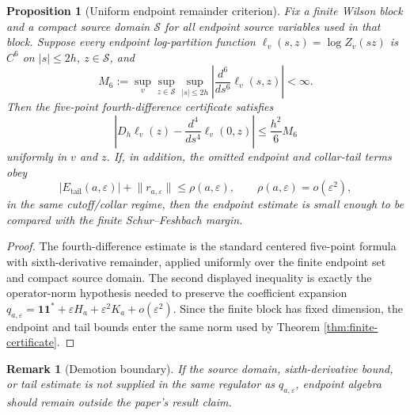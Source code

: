 \documentclass[11pt]{article}
\newtheorem{proposition}[theorem]{Proposition}
\newtheorem{remark}[theorem]{Remark}
\newcommand{\one}{\mathbf 1}
\newcommand{\eps}{\varepsilon}
\newcommand{\norm}[1]{\lVert #1\rVert}
\begin{document}
\begin{proposition}[Uniform endpoint remainder criterion]
\label{prop:uniform-endpoint-remainder}
Fix a finite Wilson block and a compact source domain \(\mathcal S\) for all endpoint source variables used in that block.  Suppose every endpoint log-partition function \(\ell_v(s,z)=\log Z_v(sz)\) is \(C^6\) on \(|s|\le2h\), \(z\in\mathcal S\), and
\[
  M_{6}:=
  \sup_{v}\sup_{z\in\mathcal S}\sup_{|s|\le2h}
  \left|\frac{d^6}{ds^6}\ell_v(s,z)\right|
  <\infty .
\]
Then the five-point fourth-difference certificate satisfies
\[
  \left|D_h\ell_v(z)-\frac{d^4}{ds^4}\ell_v(0,z)\right|
  \le \frac{h^2}{6}M_6
\]
uniformly in \(v\) and \(z\).  If, in addition, the omitted endpoint and collar-tail terms obey
\[
  |E_{\mathrm{tail}}(a,\eps)|+\norm{r_{a,\eps}}\le \rho(a,\eps),
  \qquad
  \rho(a,\eps)=o(\eps^2),
\]
in the same cutoff/collar regime, then the endpoint estimate is small enough to be compared with the finite Schur--Feshbach margin.
\end{proposition}

\begin{proof}
The fourth-difference estimate is the standard centered five-point formula with sixth-derivative remainder, applied uniformly over the finite endpoint set and compact source domain.  The second displayed inequality is exactly the operator-norm hypothesis needed to preserve the coefficient expansion \(q_{a,\eps}=\one\one^*+\eps H_a+\eps^2K_a+o(\eps^2)\).  Since the finite block has fixed dimension, the endpoint and tail bounds enter the same norm used by Theorem \ref{thm:finite-certificate}.
\end{proof}

\begin{remark}[Demotion boundary]
If the source domain, sixth-derivative bound, or tail estimate is not supplied in the same regulator as \(q_{a,\eps}\), endpoint algebra should remain outside the paper's result claim.
\end{remark}
\end{document}
